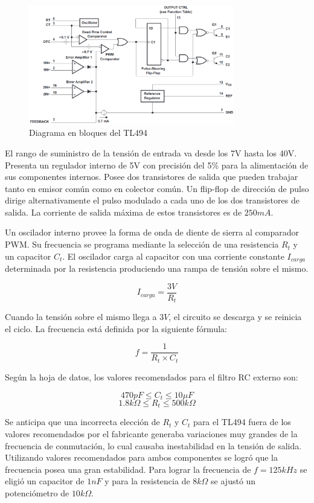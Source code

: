 \begin{figure}[H]
    \centering
    \includegraphics[width=0.8\textwidth]{images/tl494-schematic.png}
    \caption{Diagrama en bloques del TL494}
    \label{fig:tl494-block-diagram}
\end{figure}

El rango de suministro de la tensión de entrada va desde los 7V hasta los 40V. 
Presenta un regulador interno de 5V con precisión del 5\% para la alimentación de sus componentes internos.
Posee dos transistores de salida que pueden trabajar tanto en emisor común como en colector común. 
Un flip-flop de dirección de pulso dirige alternativamente el pulso modulado a cada uno de los dos transistores de salida. 
La corriente de salida máxima de estos transistores es de $250mA$.

Un oscilador interno provee la forma de onda de diente de sierra al comparador PWM. 
Su frecuencia se programa mediante la selección de una resistencia $R_t$ y un capacitor $C_t$. 
El oscilador carga al capacitor con una corriente constante $I_{carga}$ determinada por la resistencia produciendo una rampa de tensión sobre el mismo.

$$ I_{carga}=\frac{3V}{R_t} $$

Cuando la tensión sobre el mismo llega a $3V$, el circuito se descarga y se reinicia el ciclo. 
La frecuencia está definida por la siguiente fórmula:

$$ f=\frac{1}{R_t\times C_t} $$

Según la hoja de datos, los valores recomendados para el filtro RC externo son:

$$ 470pF\leq C_t\leq 10\mu F$$
$$ 1.8k\Omega\leq R_t\leq 500k\Omega $$

Se anticipa que una incorrecta elección de $R_t$ y $C_t$ para el TL494 fuera de los valores recomendados por el fabricante generaba variaciones muy grandes de la frecuencia de conmutación, 
lo cual causaba inestabilidad en la tensión de salida. 
Utilizando valores recomendados para ambos componentes se logró que la frecuencia posea una gran estabilidad.
Para lograr la frecuencia de $f=125kHz$ se eligió un capacitor de $1nF$ y para la resistencia de $8k\Omega$ se ajustó un potenciómetro de $10k\Omega$. 

